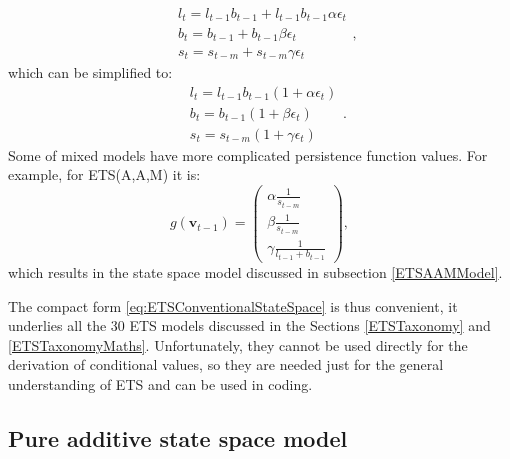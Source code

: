\documentclass[
]{book}
\theoremstyle{definition}
\theoremstyle{definition}
\theoremstyle{definition}
\theoremstyle{definition}
\theoremstyle{remark}
\begin{document}
\begin{enumerate}
  \begin{equation}
    \begin{aligned}
    & {l}_{t} = l_{t-1} b_{t-1} + l_{t-1} b_{t-1} \alpha\epsilon_t \\
    & b_t = b_{t-1} + b_{t-1} \beta\epsilon_t \\
    & s_t = s_{t-m} + s_{t-m} \gamma\epsilon_t
    \end{aligned},
    \label{eq:ETSMMMTransitionEquation01}
  \end{equation}
  which can be simplified to:
  \begin{equation}
    \begin{aligned}
    & {l}_{t} = l_{t-1}b_{t-1} (1+\alpha\epsilon_t)\\
    & b_t = b_{t-1} (1+\beta\epsilon_t)\\
    & s_t = s_{t-m} (1+\gamma\epsilon_t)
    \end{aligned} .
    \label{eq:ETSMMMTransitionEquation}
  \end{equation}
  Some of mixed models have more complicated persistence function values. For example, for ETS(A,A,M) it is:
  \begin{equation}
    g(\mathbf{v}_{t-1}) =
    \begin{pmatrix}
     \alpha \frac{1}{s_{t-m}} \\
     \beta \frac{1}{s_{t-m}} \\
     \gamma \frac{1}{l_{t-1} + b_{t-1}}
    \end{pmatrix} ,
  \end{equation}
  which results in the state space model discussed in subsection \ref{ETSAAMModel}.
\end{enumerate}

The compact form \eqref{eq:ETSConventionalStateSpace} is thus convenient, it underlies all the 30 ETS models discussed in the Sections \ref{ETSTaxonomy} and \ref{ETSTaxonomyMaths}. Unfortunately, they cannot be used directly for the derivation of conditional values, so they are needed just for the general understanding of ETS and can be used in coding.

\hypertarget{ETSConventionalModelAdditive}{%
\subsection{Pure additive state space model}\label{ETSConventionalModelAdditive}}
\end{document}
